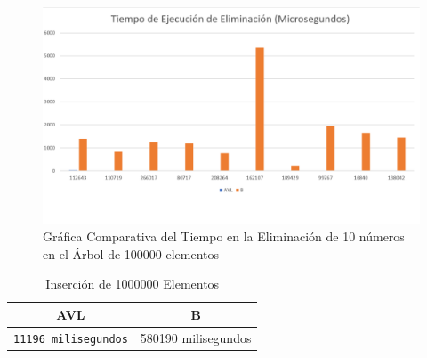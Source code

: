 \documentclass[acmsmall]{acmart}
\begin{document}
\begin{figure}[ht]
  \centering
  \caption{Gráfica Comparativa del Tiempo en la Eliminación de 10 números en el Árbol de 100000 elementos}

  \includegraphics[angle=0,scale=0.5]{100000.3 elem.png}
  
\end{figure}

\clearpage



\begin{table}[t]
\begin{center}
  \caption{Inserción de 1000000 Elementos}
  \begin{tabular}{cc}
    \toprule
    AVL & B\\
    \midrule
    \texttt{11196 milisegundos} & 580190 milisegundos \\
    \bottomrule
  \end{tabular}
  \end{center}
\end{table}
\end{document}

